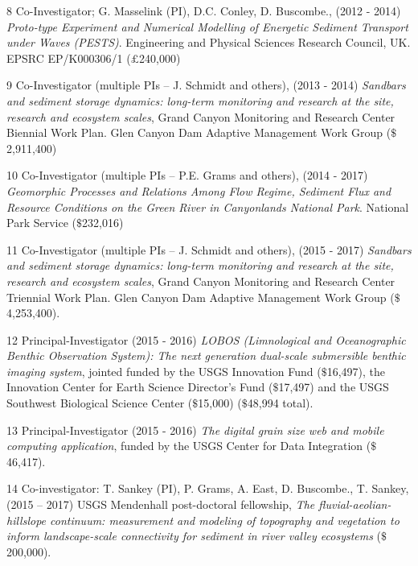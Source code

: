 \documentclass[margin,line]{resume}
\begin{document}
\begin{resume}
\begin{footnotesize}
\begin{list1}
	\item[8] Co-Investigator; G. Masselink (PI), D.C. Conley, D. Buscombe., (2012 - 2014) {\sl Proto-type Experiment and Numerical Modelling of Energetic Sediment Transport under Waves (PESTS)}. Engineering and Physical Sciences Research Council, UK. EPSRC EP/K000306/1 ($\pounds$240,000)\\

	\item[9] Co-Investigator (multiple PIs – J. Schmidt and others), (2013 - 2014) {\sl Sandbars and sediment storage dynamics: long-term monitoring and research at the site, research and ecosystem scales}, Grand Canyon Monitoring and Research Center Biennial Work Plan. Glen Canyon Dam Adaptive Management Work Group ($\$$2,911,400)\\

	\item[10] Co-Investigator (multiple PIs – P.E. Grams and others), (2014 - 2017) {\sl Geomorphic Processes and Relations Among Flow Regime, Sediment Flux and Resource Conditions on the Green River in Canyonlands National Park}. National Park Service ($\$$232,016)\\

	\item[11] Co-Investigator (multiple PIs – J. Schmidt and others), (2015 - 2017) {\sl Sandbars and sediment storage dynamics: long-term monitoring and research at the site, research and ecosystem scales}, Grand Canyon Monitoring and Research Center Triennial Work Plan. Glen Canyon Dam Adaptive Management Work Group ($\$$4,253,400).\\

	\item[12] Principal-Investigator (2015 - 2016) {\sl LOBOS (Limnological and Oceanographic Benthic Observation System): The next generation dual-scale submersible benthic imaging system}, jointed funded by the USGS Innovation Fund ($\$$16,497), the Innovation Center for Earth Science Director's Fund ($\$$17,497) and the USGS Southwest Biological Science Center ($\$$15,000) ($\$$48,994 total).\\

	\item[13] Principal-Investigator (2015 - 2016) {\sl The digital grain size web and mobile computing application}, funded by the USGS Center for Data Integration ($\$$46,417).\\
	
	\item[14] Co-investigator: T. Sankey (PI), P. Grams, A. East, D. Buscombe., T. Sankey, (2015 – 2017) USGS Mendenhall post-doctoral fellowship, {\sl The fluvial-aeolian- hillslope continuum: measurement and modeling of topography and vegetation to inform landscape-scale connectivity for sediment in river valley ecosystems} ($\$$200,000).\\


\end{list1}
\end{footnotesize}
\end{resume}
\end{document}

